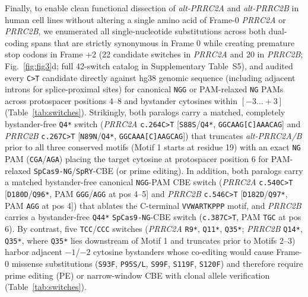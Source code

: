\documentclass[10pt,letterpaper]{article}
\newcommand{\gene}[1]{\textit{#1}}
\begin{document}
Finally, to enable clean functional dissection of \gene{alt-PRRC2A} and \gene{alt-PRRC2B} in human cell lines without altering a single amino acid of Frame-0 \gene{PRRC2A} or \gene{PRRC2B}, we enumerated all single-nucleotide substitutions across both dual-coding spans that are strictly synonymous in Frame 0 while creating premature stop codons in Frame +2 (22 candidate switches in \gene{PRRC2A} and 20 in \gene{PRRC2B}; Fig.~\ref{fig:fig3}d; full 42-switch catalog in Supplementary Table~S5), and audited every \texttt{C>T} candidate directly against hg38 genomic sequence (including adjacent introns for splice-proximal sites) for canonical \texttt{NGG} or PAM-relaxed \texttt{NG} PAMs across protospacer positions 4--8 and bystander cytosines within $[-3\ldots+3]$ (Table~\ref{tab:switches}). Strikingly, both paralogs carry a matched, completely bystander-free \texttt{Q4*} switch (\gene{PRRC2A} \texttt{c.264C>T} [\texttt{S88S}/\texttt{Q4*}, \texttt{GGCAAG[C]AAACAG}] and \gene{PRRC2B} \texttt{c.267C>T} [\texttt{N89N}/\texttt{Q4*}, \texttt{GGCAAA[C]AAGCAG}]) that truncates \gene{alt-PRRC2A/B} prior to all three conserved motifs (Motif 1 starts at residue 19) with an exact \texttt{NG} PAM (\texttt{CGA}/\texttt{AGA}) placing the target cytosine at protospacer position 6 for PAM-relaxed \texttt{SpCas9-NG}/\texttt{SpRY}-CBE (or prime editing). In addition, both paralogs carry a matched bystander-free canonical \texttt{NGG}-PAM CBE switch (\gene{PRRC2A} \texttt{c.540C>T} [\texttt{D180D}/\texttt{Q96*}, PAM \texttt{GGG}/\texttt{AGG} at pos 4--5] and \gene{PRRC2B} \texttt{c.546C>T} [\texttt{D182D}/\texttt{Q97*}, PAM \texttt{AGG} at pos 4]) that ablates the C-terminal \texttt{VVWARTKPPP} motif, and \gene{PRRC2B} carries a bystander-free \texttt{Q44*} \texttt{SpCas9-NG}-CBE switch (\texttt{c.387C>T}, PAM \texttt{TGC} at pos 6). By contrast, five \texttt{TCC}/\texttt{CCC} switches (\gene{PRRC2A} \texttt{R9*}, \texttt{Q11*}, \texttt{Q35*}; \gene{PRRC2B} \texttt{Q14*}, \texttt{Q35*}, where \texttt{Q35*} lies downstream of Motif 1 and truncates prior to Motifs 2--3) harbor adjacent $-1$/$-2$ cytosine bystanders whose co-editing would cause Frame-0 missense substitutions (\texttt{S93F}, \texttt{P95S/L}, \texttt{S99F}, \texttt{S119F}, \texttt{S120F}) and therefore require prime editing (PE) or narrow-window CBE with clonal allele verification (Table~\ref{tab:switches}).
\end{document}
